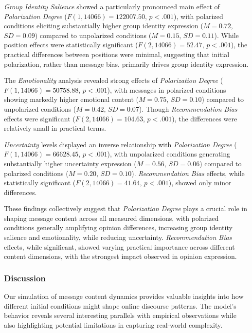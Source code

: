 

\emph{Group Identity Salience} showed a particularly pronounced main effect of \emph{Polarization Degree} ($F(1, 14066) = 122007.50$, $p < .001$), with polarized conditions eliciting substantially higher group identity expression ($M = 0.72$, $SD = 0.09$) compared to unpolarized conditions ($M = 0.15$, $SD = 0.11$). While position effects were statistically significant ($F(2, 14066) = 52.47$, $p < .001$), the practical differences between positions were minimal, suggesting that initial polarization, rather than message bias, primarily drives group identity expression.


The \emph{Emotionality} analysis revealed strong effects of \emph{Polarization Degree} ($F(1, 14066) = 50758.88$, $p < .001$), with messages in polarized conditions showing markedly higher emotional content ($M = 0.75$, $SD = 0.10$) compared to unpolarized conditions ($M = 0.42$, $SD = 0.07$). Though \emph{Recommendation Bias} effects were significant ($F(2, 14066) = 104.63$, $p < .001$), the differences were relatively small in practical terms.

\emph{Uncertainty} levels displayed an inverse relationship with \emph{Polarization Degree} ($F(1, 14066) = 66628.45$, $p < .001$), with unpolarized conditions generating substantially higher uncertainty expression ($M = 0.56$, $SD = 0.06$) compared to polarized conditions ($M = 0.20$, $SD = 0.10$). \emph{Recommendation Bias} effects, while statistically significant ($F(2, 14066) = 41.64$, $p < .001$), showed only minor differences.



These findings collectively suggest that \emph{Polarization Degree} plays a crucial role in shaping message content across all measured dimensions, with polarized conditions generally amplifying opinion differences, increasing group identity salience and emotionality, while reducing uncertainty. \emph{Recommendation Bias} effects, while significant, showed varying practical importance across different content dimensions, with the strongest impact observed in opinion expression.

\subsubsection{Discussion}

Our simulation of message content dynamics provides valuable insights into how different initial conditions might shape online discourse patterns. The model's behavior reveals several interesting parallels with empirical observations while also highlighting potential limitations in capturing real-world complexity.

